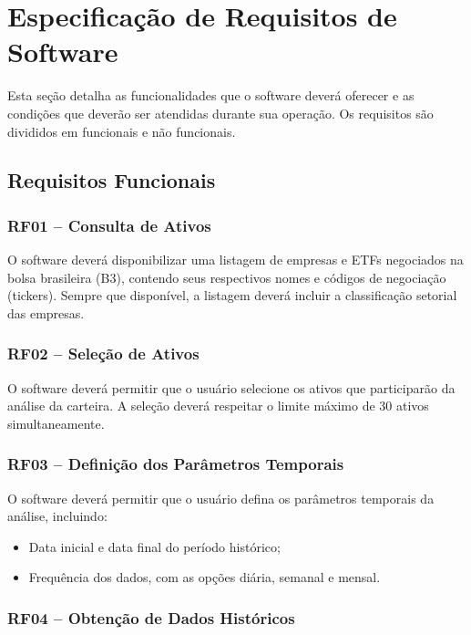 \section{Especificação de Requisitos de Software}

Esta seção detalha as funcionalidades que o software deverá
oferecer e as condições que deverão ser atendidas durante sua
operação. Os requisitos são divididos em funcionais e não
funcionais.



\subsection{Requisitos Funcionais}

\subsubsection{RF01 -- Consulta de Ativos}

O software deverá disponibilizar uma listagem de empresas e
ETFs negociados na bolsa brasileira (B3), contendo seus
respectivos nomes e códigos de negociação (tickers). Sempre
que disponível, a listagem deverá incluir a classificação
setorial das empresas.

\subsubsection{RF02 -- Seleção de Ativos}

O software deverá permitir que o usuário selecione os ativos 
que participarão da análise da carteira.
A seleção deverá respeitar o limite máximo de 30 ativos
simultaneamente.

\subsubsection{RF03 -- Definição dos Parâmetros Temporais}

O software deverá permitir que o usuário defina os parâmetros
temporais da análise, incluindo:

\begin{itemize}
    \item Data inicial e data final do período histórico;

    \item Frequência dos dados, com as opções diária,
    semanal e mensal.
\end{itemize}

\subsubsection{RF04 -- Obtenção de Dados Históricos}

